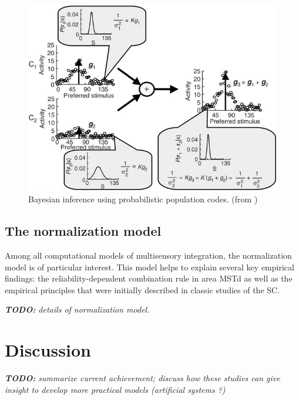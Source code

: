 \documentclass{article}[11pt]
\newcommand{\TODO}[1]{\emph{\small{{\bf TODO: } #1}}}
\begin{document}
\begin{figure}[tpbh]
  \centering
  \includegraphics[width=\textwidth]{infer}
  \caption{Bayesian inference using probabilistic population codes. (from \cite{ma_bayesian_2006})}
  \label{fig:infer}
\end{figure}




\subsection{The normalization model}
Among all computational models of multisensory integration, the normalization model \cite{ohshiro_normalization_2011} is of particular interest. This model helps to explain several key empirical findings: the reliability-dependent combination rule in area MSTd as well as
the empirical principles that were initially described in classic studies of the SC.

\TODO{details of normalization model.}

\section{Discussion}
\TODO{summarize current achievement; discuss how these studies can give insight to develop more practical models (artificial systems ?)}



\end{document}

